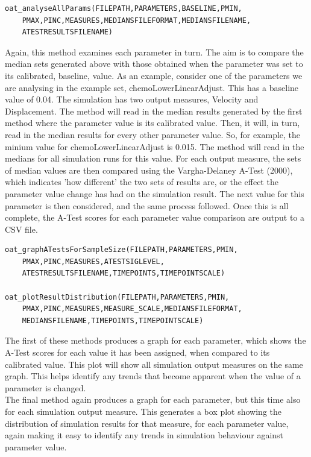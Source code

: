 \documentclass[a4paper,11pt]{article}
\begin{document}
\begin{enumerate}
\begin{verbatim}
oat_analyseAllParams(FILEPATH,PARAMETERS,BASELINE,PMIN,
	PMAX,PINC,MEASURES,MEDIANSFILEFORMAT,MEDIANSFILENAME,
	ATESTRESULTSFILENAME)
\end{verbatim}

Again, this method examines each parameter in turn.  The aim is to compare the median sets generated above with those obtained when the parameter was set to its calibrated, baseline, value.  As an example, consider one of the parameters we are analysing in the example set, chemoLowerLinearAdjust.  This has a baseline value of 0.04. The simulation has two output measures, Velocity and Displacement. The method will read in the median results generated by the first method where the parameter value is its calibrated value. Then, it will, in turn, read in the median results for every other parameter value. So, for example, the minium value for chemoLowerLinearAdjust is 0.015. The method will read in the medians for all simulation runs for this value. For each output measure, the sets of median values are then compared using the Vargha-Delaney A-Test (2000), which indicates 'how different' the two sets of results are, or the effect the parameter value change has had on the simulation result. The next value for this parameter is then considered, and the same process followed.  Once this is all complete, the A-Test scores for each parameter value comparison are output to a CSV file.\\

\begin{verbatim}
oat_graphATestsForSampleSize(FILEPATH,PARAMETERS,PMIN,
	PMAX,PINC,MEASURES,ATESTSIGLEVEL,
	ATESTRESULTSFILENAME,TIMEPOINTS,TIMEPOINTSCALE)

oat_plotResultDistribution(FILEPATH,PARAMETERS,PMIN,
	PMAX,PINC,MEASURES,MEASURE_SCALE,MEDIANSFILEFORMAT,
	MEDIANSFILENAME,TIMEPOINTS,TIMEPOINTSCALE)
\end{verbatim}

The first of these methods produces a graph for each parameter, which shows the A-Test scores for each value it has been assigned, when compared to its calibrated value. This plot will show all simulation output measures on the same graph. This helps identify any trends that become apparent when the value of a parameter is changed. 
\\
The final method again produces a graph for each parameter, but this time also for each simulation output measure. This generates a box plot showing the distribution of simulation results for that measure, for each parameter value, again making it easy to identify any trends in simulation behaviour against parameter value. 


\end{enumerate}
\end{document}
